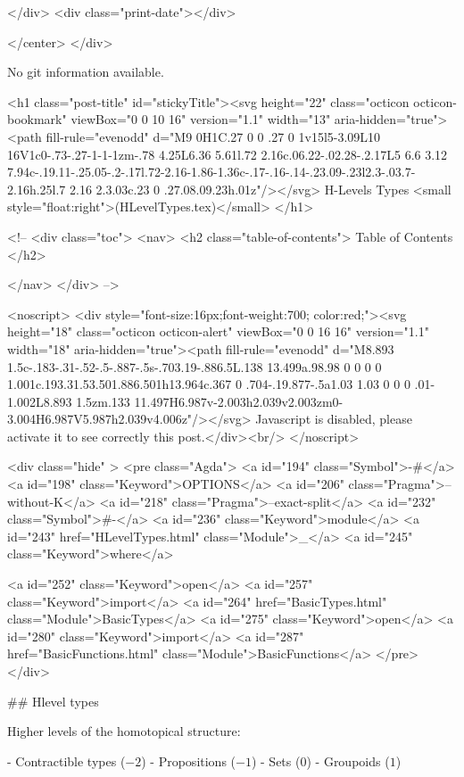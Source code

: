           
        </div>
        <div class="print-date"></div>
        
        
    </center>
  </div>

  
  No git information available.
  

  <h1 class="post-title" id="stickyTitle"><svg height="22" class="octicon octicon-bookmark" viewBox="0 0 10 16" version="1.1" width="13" aria-hidden="true"><path fill-rule="evenodd" d="M9 0H1C.27 0 0 .27 0 1v15l5-3.09L10 16V1c0-.73-.27-1-1-1zm-.78 4.25L6.36 5.61l.72 2.16c.06.22-.02.28-.2.17L5 6.6 3.12 7.94c-.19.11-.25.05-.2-.17l.72-2.16-1.86-1.36c-.17-.16-.14-.23.09-.23l2.3-.03.7-2.16h.25l.7 2.16 2.3.03c.23 0 .27.08.09.23h.01z"/></svg> H-Levels Types <small style="float:right">(HLevelTypes.tex)</small>
  </h1>

  <!-- 
  <div class="toc">
    <nav>
    <h2 class="table-of-contents"> Table of Contents </h2>
      

    </nav>
  </div>
   -->

  <noscript>
  <div style="font-size:16px;font-weight:700; color:red;"><svg height="18" class="octicon octicon-alert" viewBox="0 0 16 16" version="1.1" width="18" aria-hidden="true"><path fill-rule="evenodd" d="M8.893 1.5c-.183-.31-.52-.5-.887-.5s-.703.19-.886.5L.138 13.499a.98.98 0 0 0 0 1.001c.193.31.53.501.886.501h13.964c.367 0 .704-.19.877-.5a1.03 1.03 0 0 0 .01-1.002L8.893 1.5zm.133 11.497H6.987v-2.003h2.039v2.003zm0-3.004H6.987V5.987h2.039v4.006z"/></svg> Javascript is disabled, please activate it to see correctly this post.</div><br/>
  </noscript>

  <div class="hide" >
<pre class="Agda">
<a id="194" class="Symbol">{-#</a> <a id="198" class="Keyword">OPTIONS</a> <a id="206" class="Pragma">--without-K</a> <a id="218" class="Pragma">--exact-split</a> <a id="232" class="Symbol">#-}</a>
<a id="236" class="Keyword">module</a> <a id="243" href="HLevelTypes.html" class="Module">_</a> <a id="245" class="Keyword">where</a>

<a id="252" class="Keyword">open</a> <a id="257" class="Keyword">import</a> <a id="264" href="BasicTypes.html" class="Module">BasicTypes</a>
<a id="275" class="Keyword">open</a> <a id="280" class="Keyword">import</a> <a id="287" href="BasicFunctions.html" class="Module">BasicFunctions</a>
</pre>
</div>


## Hlevel types

Higher levels of the homotopical structure:

- Contractible types ($-2$)
- Propositions ($-1$)
- Sets ($0$)
- Groupoids ($1$)


